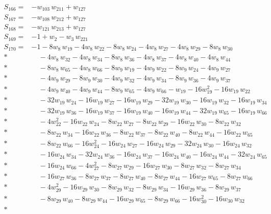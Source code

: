 \documentclass[11pt]{article}
\theoremstyle{remark}\newtheorem{remark}[theorem]{Remark}
\begin{document}
\begin{align*}
S_{166}={}& -w_{103}\,w_{211} + w_{127} \\[2pt]
S_{167}={}& -w_{108}\,w_{212} + w_{127} \\[2pt]
S_{168}={}& -w_{121}\,w_{213} + w_{127} \\[2pt]
S_{169}={}& -1 + w_{2} - w_{3}\,w_{221} \\[2pt]
S_{170}={}& -1 - 8w_{8}\,w_{19} - 4w_{8}\,w_{22} - 8w_{8}\,w_{24} - 4w_{8}\,w_{27} - 4w_{8}\,w_{29} - 8w_{8}\,w_{30} \\*
&\quad  - 4w_{8}\,w_{32} - 4w_{8}\,w_{34} - 8w_{8}\,w_{36} - 4w_{8}\,w_{37} - 4w_{8}\,w_{40} - 4w_{8}\,w_{44} \\*
&\quad  - 8w_{8}\,w_{65} - 4w_{8}\,w_{66} - 8w_{9}\,w_{19} - 4w_{9}\,w_{22} - 8w_{9}\,w_{24} - 4w_{9}\,w_{27} \\*
&\quad  - 4w_{9}\,w_{29} - 8w_{9}\,w_{30} - 4w_{9}\,w_{32} - 4w_{9}\,w_{34} - 8w_{9}\,w_{36} - 4w_{9}\,w_{37} \\*
&\quad  - 4w_{9}\,w_{40} - 4w_{9}\,w_{44} - 8w_{9}\,w_{65} - 4w_{9}\,w_{66} - w_{19} - 16w_{19}^{2} - 16w_{19}\,w_{22} \\*
&\quad  - 32w_{19}\,w_{24} - 16w_{19}\,w_{27} - 16w_{19}\,w_{29} - 32w_{19}\,w_{30} - 16w_{19}\,w_{32} - 16w_{19}\,w_{34} \\*
&\quad  - 32w_{19}\,w_{36} - 16w_{19}\,w_{37} - 16w_{19}\,w_{40} - 16w_{19}\,w_{44} - 32w_{19}\,w_{65} - 16w_{19}\,w_{66} \\*
&\quad  - 4w_{22}^{2} - 16w_{22}\,w_{24} - 8w_{22}\,w_{27} - 8w_{22}\,w_{29} - 16w_{22}\,w_{30} - 8w_{22}\,w_{32} \\*
&\quad  - 8w_{22}\,w_{34} - 16w_{22}\,w_{36} - 8w_{22}\,w_{37} - 8w_{22}\,w_{40} - 8w_{22}\,w_{44} - 16w_{22}\,w_{65} \\*
&\quad  - 8w_{22}\,w_{66} - 16w_{24}^{2} - 16w_{24}\,w_{27} - 16w_{24}\,w_{29} - 32w_{24}\,w_{30} - 16w_{24}\,w_{32} \\*
&\quad  - 16w_{24}\,w_{34} - 32w_{24}\,w_{36} - 16w_{24}\,w_{37} - 16w_{24}\,w_{40} - 16w_{24}\,w_{44} - 32w_{24}\,w_{65} \\*
&\quad  - 16w_{24}\,w_{66} - 4w_{27}^{2} - 8w_{27}\,w_{29} - 16w_{27}\,w_{30} - 8w_{27}\,w_{32} - 8w_{27}\,w_{34} \\*
&\quad  - 16w_{27}\,w_{36} - 8w_{27}\,w_{37} - 8w_{27}\,w_{40} - 8w_{27}\,w_{44} - 16w_{27}\,w_{65} - 8w_{27}\,w_{66} \\*
&\quad  - 4w_{29}^{2} - 16w_{29}\,w_{30} - 8w_{29}\,w_{32} - 8w_{29}\,w_{34} - 16w_{29}\,w_{36} - 8w_{29}\,w_{37} \\*
&\quad  - 8w_{29}\,w_{40} - 8w_{29}\,w_{44} - 16w_{29}\,w_{65} - 8w_{29}\,w_{66} - 16w_{30}^{2} - 16w_{30}\,w_{32} \\*

\end{align*}
\end{document}
